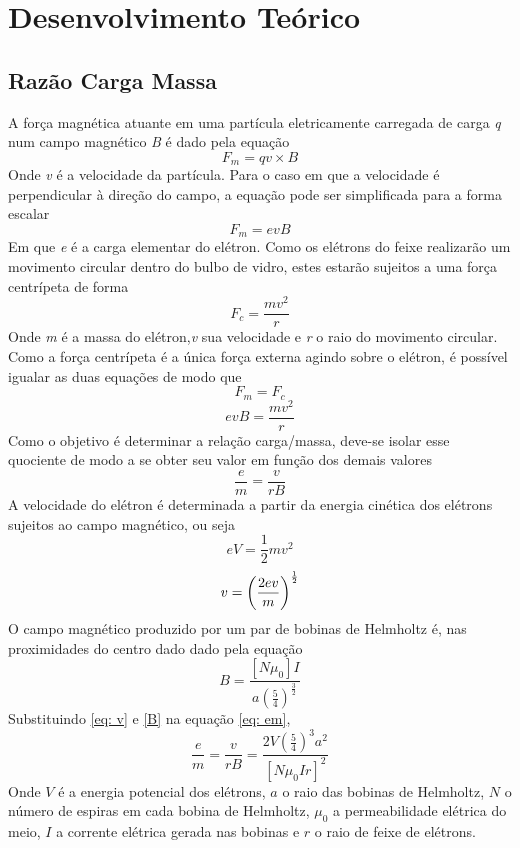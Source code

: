 \section{Desenvolvimento Teórico}
\subsection{Razão Carga Massa}
A força magnética atuante em uma partícula eletricamente carregada de carga {\it q} num campo magnético {\it B} é dado pela equação
\begin{equation}
F_m = qv \times B
\end{equation}
Onde {\it v} é a velocidade da partícula. Para o caso em que a velocidade é perpendicular à direção do campo, a equação pode ser simplificada para a forma escalar
\begin{equation}
	F_m = evB
\end{equation}
Em que {\it e} é a carga elementar do elétron. Como os elétrons do feixe realizarão um movimento circular dentro do bulbo de vidro, estes estarão sujeitos a uma força centrípeta de forma
\begin{equation}
	F_c = \frac{mv^2}{r}
\end{equation}
Onde {\it m} é a massa do elétron,{\it v} sua velocidade e {\it r} o raio do movimento circular. Como a força centrípeta é a única força externa agindo sobre o elétron, é possível igualar as duas equações de modo que
\begin{equation}
	F_m = F_c
\end{equation}
\begin{equation}
	evB = \frac{mv^2}{r}
\end{equation}
Como o objetivo é determinar a relação carga/massa, deve-se isolar esse quociente de modo a se obter seu valor em função dos demais valores
\begin{equation}
	\frac{e}{m}=\frac{v}{rB}
	\label{eq: em}
\end{equation}
A velocidade do elétron é determinada a partir da energia cinética dos elétrons sujeitos ao campo magnético, ou seja
\begin{equation}
	eV = \frac{1}{2}mv^2
\end{equation}
\begin{equation}
	\\ v = \left(\frac{2ev}{m}\right)^{\frac{1}{2}}
	\label{eq: v}
\end{equation}
O campo magnético produzido por um par de bobinas de Helmholtz é, nas proximidades do centro dado dado pela equação
 \begin{equation}
 	B = \frac{[N\mu _0]I}{a\left(\frac{5}{4}\right)^{\frac{3}{2}}}
	\label{B}
 \end{equation}
Substituindo \ref{eq: v} e \ref{B} na equação \ref{eq: em},
\begin{equation}
	\frac{e}{m}=\frac{v}{rB}=\frac{2V\left(\frac{5}{4}\right)^3a^2}{[N\mu _0 Ir]^2}
	\label{e/m}
\end{equation}
Onde $V$ é a energia potencial dos elétrons, $a$ o raio das bobinas de Helmholtz, $N$ o número de espiras em cada bobina de Helmholtz, $\mu _0$ a permeabilidade elétrica do meio, $I$ a corrente elétrica gerada nas bobinas e $r$ o raio de feixe de elétrons.


